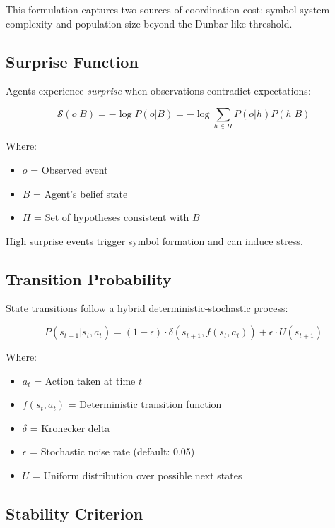 \documentclass[11pt,a4paper]{article}
\begin{document}
This formulation captures two sources of coordination cost: symbol system complexity and population size beyond the Dunbar-like threshold.

\subsection{Surprise Function}

Agents experience \textit{surprise} when observations contradict expectations:

\begin{equation}
\mathcal{S}(o | B) = -\log P(o | B) = -\log \sum_{h \in H} P(o | h) P(h | B)
\end{equation}

Where:
\begin{itemize}
    \item $o$ = Observed event
    \item $B$ = Agent's belief state
    \item $H$ = Set of hypotheses consistent with $B$
\end{itemize}

High surprise events trigger symbol formation and can induce stress.

\subsection{Transition Probability}

State transitions follow a hybrid deterministic-stochastic process:

\begin{equation}
P(s_{t+1} | s_t, a_t) = (1 - \epsilon) \cdot \delta(s_{t+1}, f(s_t, a_t)) + \epsilon \cdot U(s_{t+1})
\end{equation}

Where:
\begin{itemize}
    \item $a_t$ = Action taken at time $t$
    \item $f(s_t, a_t)$ = Deterministic transition function
    \item $\delta$ = Kronecker delta
    \item $\epsilon$ = Stochastic noise rate (default: 0.05)
    \item $U$ = Uniform distribution over possible next states
\end{itemize}

\subsection{Stability Criterion}
\end{document}

